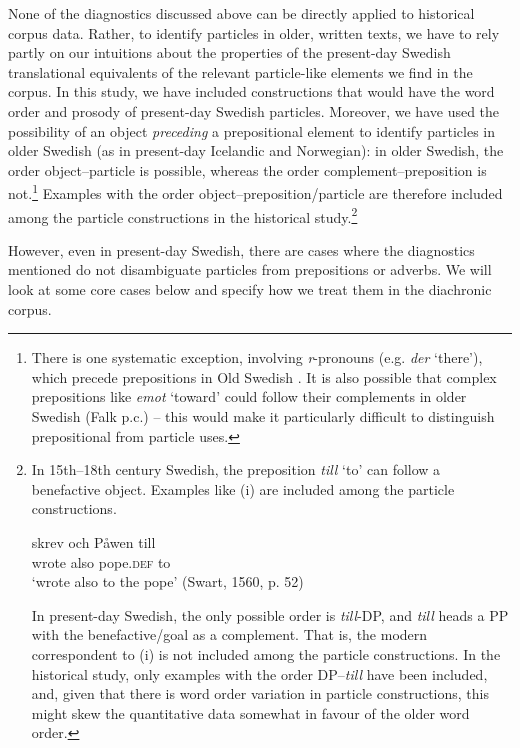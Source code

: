 \documentclass[output=paper]{langscibook}
\begin{document}
None of the diagnostics discussed above can be directly applied to historical corpus data. Rather, to identify particles in older, written texts, we have to rely partly on our intuitions about the properties of the present-day Swedish translational equivalents of the relevant particle-like elements we find in the corpus. In this study, we have included constructions that would have the word order and prosody of present-day Swedish particles. Moreover, we have used the possibility of an object \textit{preceding} a prepositional element to identify particles in older Swedish (as in present-day Icelandic and Norwegian): in older Swedish, the order object–particle is possible, whereas the order complement–preposition is not.\footnote{There is one systematic exception, involving \textit{r}{}-pronouns (e.g. \textit{der} ‘there’), which precede prepositions in Old Swedish \citep{Delsing2014Svenskans}. It is also possible that complex prepositions like \textit{emot} ‘toward’ could follow their complements in older Swedish (Falk p.c.) – this would make it particularly difficult to distinguish prepositional from particle uses.}  Examples with the order object–preposition/particle are therefore included among the particle constructions in the historical study.\footnote{In
    15th–18th century Swedish, the preposition \textit{till} ‘to’ can follow a benefactive object. Examples like (i) are included among the particle constructions.

    \ea
    \gll skrev   och   Påwen   till\\
    wrote   also  pope.\textsc{def}   to\\
    \glt ‘wrote also to the pope’ (Swart, 1560, p. 52)
    \z

    In present-day Swedish, the only possible order is \textit{till}-DP, and \textit{till} heads a PP with the benefactive/goal as a complement. That is, the modern correspondent to (i) is not included among the particle constructions. In the historical study, only examples with the order DP–\textit{till} have been included, and, given that there is word order variation in particle constructions, this might skew the quantitative data somewhat in favour of the older word order.
}



However, even in present-day Swedish, there are cases where the diagnostics mentioned do not disambiguate particles from prepositions or adverbs. We will look at some core cases below and specify how we treat them in the diachronic corpus.
\end{document}
